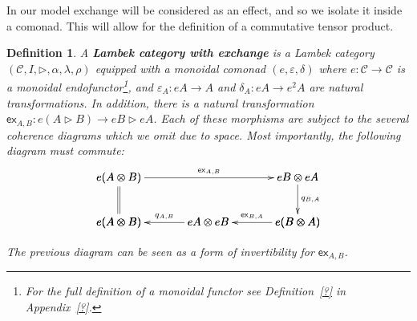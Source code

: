 \documentclass{sigplanconf}
\let\mto\to
\let\to\relax
\newcommand{\to}{\rightarrow}
\newcommand{\cat}[1]{\mathcal{#1}}
\newtheorem{definition}[theorem]{Definition}
\begin{document}
In our model exchange will be considered as an effect, and so we
isolate it inside a comonad.  This will allow for the definition of a
commutative tensor product.
\begin{definition}
  \label{def:exchange-comonad}
  A \textbf{Lambek category with exchange} is a Lambek category
  $(\cat{C}, I, \rhd, \alpha, \lambda, \rho)$ equipped with a monoidal
  comonad $(e, \varepsilon, \delta)$ where $e : \cat{C} \mto \cat{C}$
  is a monoidal endofunctor\footnote{For the full definition of a
    monoidal functor see Definition~\ref{?} in Appendix~\ref{?}.}, and
  $\varepsilon_A : eA \mto A$ and $\delta_A : eA \mto e^2A$ are
  natural transformations.  In addition, there is a natural
  transformation $\mathsf{ex}_{A,B} : e(A \rhd B) \mto eB \rhd
  eA$. Each of these morphisms are subject to the several coherence
  diagrams which we omit due to space.  Most importantly, the
  following diagram must commute:
  \[
  \bfig
    \square/->`=`->`/<1600,400>[
      e(A\otimes B)`
      eB\otimes eA`
      e(A\otimes B)`
      e(B\otimes A);
      \mathsf{ex}_{A,B}``
      q_{B,A}`]
    \morphism(800,0)<-800,0>[
      eA\otimes eB`
      e(A\otimes B);
      q_{A,B}]
    \morphism(1600,0)<-800,0>[
      e(B\otimes A)`
      eA\otimes eB;
      \mathsf{ex}_{B,A}]
    \efig
    \]
  
  
    \noindent
  The previous diagram can be seen as a form of invertibility for
  $\mathsf{ex}_{A,B}$.
\end{definition}
\end{document}
